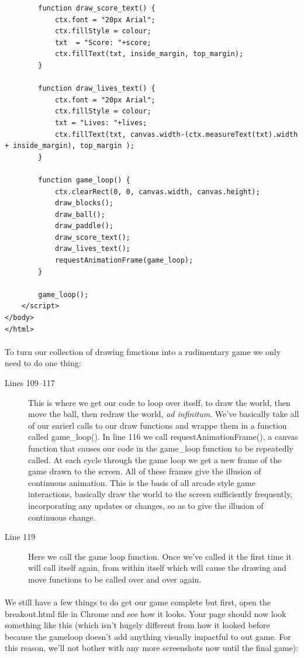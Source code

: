 \documentclass[10pt, a4paper, oneside]{article}
\begin{document}
\begin{lstlisting}
        function draw_score_text() {
            ctx.font = "20px Arial";
            ctx.fillStyle = colour;
            txt  = "Score: "+score;
            ctx.fillText(txt, inside_margin, top_margin);
        }

        function draw_lives_text() {
            ctx.font = "20px Arial";
            ctx.fillStyle = colour;
            txt = "Lives: "+lives;
            ctx.fillText(txt, canvas.width-(ctx.measureText(txt).width + inside_margin), top_margin );
        }

        function game_loop() {
            ctx.clearRect(0, 0, canvas.width, canvas.height);
            draw_blocks();
            draw_ball();
            draw_paddle();
            draw_score_text();
            draw_lives_text();
            requestAnimationFrame(game_loop);
        }
        
        game_loop();
    </script>
</body>
</html>
\end{lstlisting}

\paragraph{} To turn our collection of drawing functions into a rudimentary game we only need to do one thing:

\begin{description}
\item[Lines 109--117] This is where we get our code to loop over itself, to draw the world, then move the ball, then redraw the world, \emph{ad infinitum}. We've basically take all of our earierl calls to our draw functions and wrappe them in a function called game\_loop(). In line 116 we call requestAnimationFrame(), a canvas function that causes our code in the game\_loop function to be repeatedly called. At each cycle through the game loop we get a new frame of the game drawn to the screen. All of these frames give the illusion of continuous animation. This is the basis of all arcade style game interactions, basically draw the world to the screen sufficiently frequently, incorporating any updates or changes, so as to give the illusion of continuous change.
\item[Line 119] Here we call the game loop function. Once we've called it the first time it will call itself again, from within itself which will cause the drawing and move functions to be called over and over again.
\end{description}

\paragraph{} We still have a few things to do get our game complete but first, open the breakout.html file in Chrome and see how it looks. Your page should now look something like this (which isn't hugely different from how it looked before because the gameloop doesn't add anything visually impactful to out game. For this reason, we'll not bother with any more screenshots now until the final game):
\end{document}
